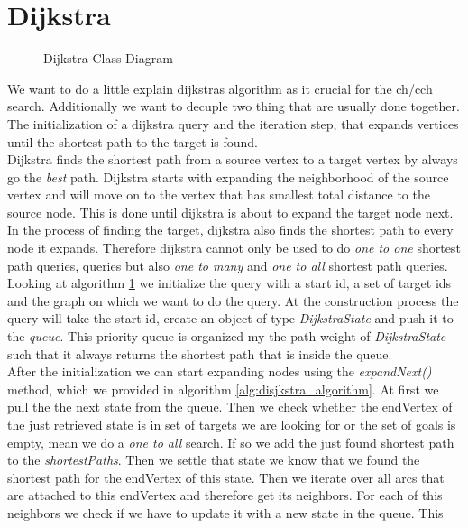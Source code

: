 \section{Dijkstra}

\begin{figure}
    \centering
    
    \caption{Dijkstra Class Diagram}
    \label{fig:dijkstra_class}
\end{figure}

We want to do a little explain dijkstras algorithm as it crucial for the ch/cch search. Additionally we want to decuple two thing that are usually done together.
The initialization of a dijkstra query and the iteration step, that expands vertices until the shortest path to the target is found. 
\\ 
Dijkstra finds the shortest path from a source vertex to a target vertex by always go the \textit{best} path. Dijkstra starts with expanding the neighborhood of
the source vertex and will move on to the vertex that has smallest total distance to the source node. This is done until dijkstra is about to expand the target node next.
In the process of finding the target, dijkstra also finds the shortest path to every node it expands. Therefore dijkstra cannot only be used to do \textit{one to one} shortest path queries,
queries but also \textit{one to many} and \textit{one to all} shortest path queries.
\\
Looking at algorithm \ref{fig:dijkstra_class} we initialize the query with a start id, a set of target ids and the graph on which we want to do the query. At the construction
process the query will take the start id, create an object of type \textit{DijkstraState} and push it to the \textit{queue}. This priority queue is organized my the path weight of 
\textit{DijkstraState} such that it always returns the shortest path that is inside the queue.
\\
After the initialization we can start expanding nodes using the \textit{expandNext()} method, which we provided in algorithm \ref{alg:disjkstra_algorithm}. At first we pull the 
the next state from the queue. Then we check whether the endVertex of the just retrieved state is in set of targets we are looking for or the set of goals is empty, mean we do a \textit{one to all} search.
If so we add the just found shortest path to the \textit{shortestPaths}. Then we settle that state we know that we found the shortest path for the endVertex of this state. Then we 
iterate over all arcs that are attached to this endVertex and therefore get its neighbors. For each of this neighbors we check if we have to update it with a new state in the queue. This
